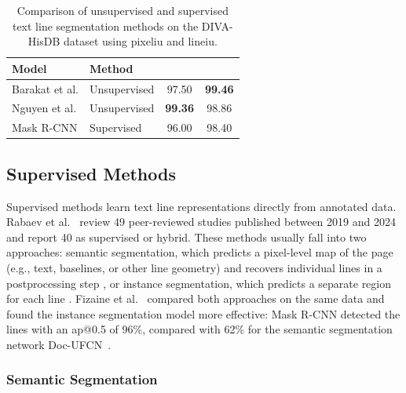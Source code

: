 \begin{table}[htbp]
	\centering
	\caption{Comparison of unsupervised and supervised text line segmentation methods on the DIVA-HisDB \cite{diva_hisdb} dataset using \gls{pixeliu} and \gls{lineiu}.}
	\label{tab:unsupervised_diva_metrics}
	\begin{tabular}{llcc}
		\toprule
		Model & Method & \glsentryshort{pixeliu} & \glsentryshort{lineiu} \\
		\midrule
		Barakat et al. \cite{barakat2020learningfree}
		& Unsupervised & 97.50 & \textbf{99.46} \\
		
		Nguyen et al. \cite{nguyen2022effective}
		& Unsupervised & \textbf{99.36} & 98.86 \\
		
		Mask R-CNN \cite{Textline_maskrcnn}
		& Supervised & 96.00 & 98.40 \\
		\bottomrule
	\end{tabular}
\end{table}

\subsection{Supervised Methods}
\label{sec:related-supervised}

Supervised methods learn text line representations directly from annotated data. Rabaev et al.~\cite{Rabaev_Litvak_2025} review 49 peer-reviewed studies published between 2019 and 2024 and report 40 as supervised or hybrid. These methods usually fall into two approaches: semantic segmentation, which predicts a pixel-level map of the page (e.g., text, baselines, or other line geometry) and recovers individual lines in a postprocessing step \cite{boillet2021docufcn, kodym2021page, Boillet2022, fizaine}, or instance segmentation, which predicts a separate region for each line \cite{Textline_maskrcnn, signals3030032, fizaine, li2023dtdt, agrawal2024linetr}. Fizaine et al.~\cite{fizaine} compared both approaches on the same data and found the instance segmentation model more effective: Mask R-CNN detected the lines with an \gls{ap}@0.5 of 96\%, compared with 62\% for the semantic segmentation network Doc-UFCN~\cite{boillet2021docufcn}.

\subsubsection{Semantic Segmentation}
\label{sec:related-segm}

